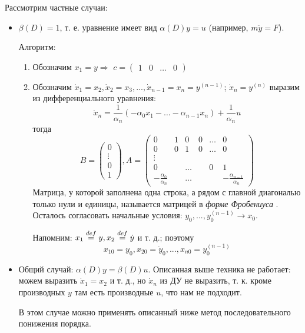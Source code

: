 \documentclass[main.tex]{subfiles}
\begin{document}
Рассмотрим частные случаи:
\begin{itemize}
    \item $ \beta(D) = 1 $, т. е. уравнение имеет вид $ \alpha(D)y = u $ (например, $ m \ddot y = F $).

    Алгоритм:

    \begin{enumerate}[noitemsep]
        \item Обозначим $ x_1 = y \Rightarrow $ $ c = \begin{pmatrix}
            1 & 0 & \dots & 0
        \end{pmatrix} $
        \item Обозначим $ \dot x_1 = x_2, \dot x_2 = x_3, ..., \dot x_{n-1} = x_n = y^{(n-1)} $; $ \dot x_n = y^{(n)} $ выразим из дифференциального уравнения:
        \[ \dot x_n = \frac{1}{\alpha_n} \left( - \alpha_0 x_1 - \dots - \alpha_{n-1} x_n \right) + \frac{1}{\alpha_n} u \]
        тогда
        \[ B = \begin{pmatrix}
            0 \\ \vdots \\ 0 \\ 1
        \end{pmatrix}, A = \begin{pmatrix}
        0 & 1 & 0 & 0 & \dots & 0 \\
        0 & 0 & 1 & 0 & \dots & 0 \\
        \vdots \\
        0 &  & \dots &  & 0 & 1 \\
        - \frac{\alpha_0}{\alpha_n} &  & \dots & & & - \frac{\alpha_{n-1}}{\alpha_n}
    \end{pmatrix} \]
    Матрица, у которой заполнена одна строка, а рядом с главной диагональю только нули и единицы, называется матрицей в \emph{ форме Фробениуса }. \\

    Осталось согласовать начальные условия: $ y_0, ..., y^{(n-1)}_0 \to x_0 $.

    Напомним: $ x_1 \overset{def}= y, x_2 \overset{def}= \dot y $ и т. д.; поэтому
    \[ x_{10} = y_0, x_20 = \dot y_0, ..., x_{n0} = y_0^{(n-1)} \]
    \end{enumerate}
    \item Общий случай: $ \alpha(D) y = \beta(D)u $.
    Описанная выше техника не работает:
    можем выразить $ \dot x_1 = x_2 $ и т. д., но $ \dot x_n $ из ДУ не выразить, т. к. кроме производных $ y $ там есть производные $ u $, что нам не подходит.

    В этом случае можно применять описанный ниже метод последовательного понижения порядка.
\end{itemize}
\end{document}
